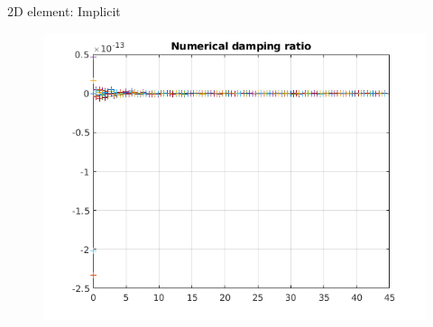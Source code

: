 \begin{frame}{2D element: Implicit}
\begin{figure}[ht]
\begin{minipage}[b]{0.5\linewidth}
  \end{minipage}%
  \begin{minipage}[b]{0.5\linewidth}
    \centering
    \includegraphics[scale=.35]{images/2D-imp-4.png} \\

  \end{minipage} 
\end{figure}
\end{frame}


